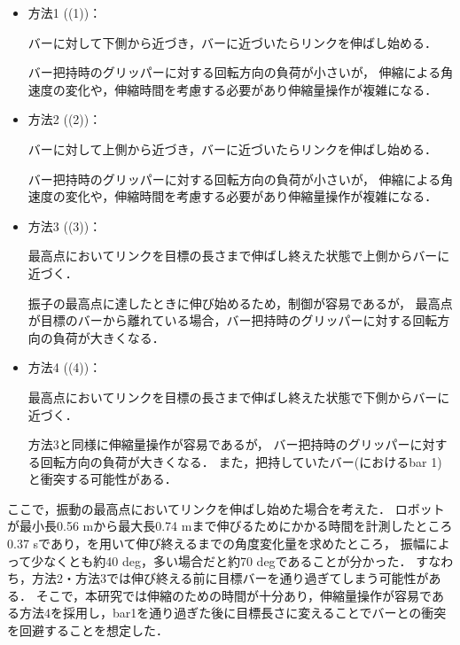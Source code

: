         \begin{itemize}
        \item 方法1 ((1))：
        
        バーに対して下側から近づき，バーに近づいたらリンクを伸ばし始める．

        バー把持時のグリッパーに対する回転方向の負荷が小さいが，
        伸縮による角速度の変化や，伸縮時間を考慮する必要があり伸縮量操作が複雑になる．
        
        \item 方法2 ((2))：
        
        バーに対して上側から近づき，バーに近づいたらリンクを伸ばし始める．
        
        バー把持時のグリッパーに対する回転方向の負荷が小さいが，
        伸縮による角速度の変化や，伸縮時間を考慮する必要があり伸縮量操作が複雑になる．

        \item 方法3 ((3))：
        
        最高点においてリンクを目標の長さまで伸ばし終えた状態で上側からバーに近づく．
        
        振子の最高点に達したときに伸び始めるため，制御が容易であるが，
        最高点が目標のバーから離れている場合，バー把持時のグリッパーに対する回転方向の負荷が大きくなる．
        
        \item 方法4 ((4))：
        
        最高点においてリンクを目標の長さまで伸ばし終えた状態で下側からバーに近づく．

        方法3と同様に伸縮量操作が容易であるが，
        バー把持時のグリッパーに対する回転方向の負荷が大きくなる．
        また，把持していたバー(におけるbar 1)と衝突する可能性がある．

        \end{itemize}

        ここで，振動の最高点においてリンクを伸ばし始めた場合を考えた．
        ロボットが最小長0.56 mから最大長0.74 mまで伸びるためにかかる時間を計測したところ
        0.37 sであり，を用いて伸び終えるまでの角度変化量を求めたところ，
        振幅によって少なくとも約40 deg，多い場合だと約70 degであることが分かった．
        すなわち，方法2・方法3では伸び終える前に目標バーを通り過ぎてしまう可能性がある．
        そこで，本研究では伸縮のための時間が十分あり，伸縮量操作が容易である方法4を採用し，bar1を通り過ぎた後に目標長さに変えることでバーとの衝突を回避することを想定した．

